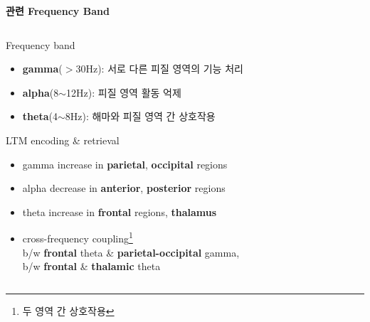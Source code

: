 \documentclass{beamer}
\begin{document}
\begin{frame}{\textbf{관련 Frequency Band}}
  \begin{columns}
    \begin{column}{0.58\textwidth}
      \begin{block}{Frequency band}
        \begin{itemize}
          \item \textbf{gamma}($>$30Hz): 서로 다른 피질 영역의 기능 처리 
          \item \textbf{alpha}(8$\sim$12Hz): 피질 영역 활동 억제
          \item \textbf{theta}(4$\sim$8Hz): 해마와 피질 영역 간 상호작용
        \end{itemize}
      \end{block}
      \begin{block}{LTM encoding \& retrieval}
        \begin{itemize}
          \item gamma increase in \textbf{parietal}, \textbf{occipital} regions
          \item alpha decrease in \textbf{anterior}, \textbf{posterior} regions
          \item theta increase in \textbf{frontal} regions, \textbf{thalamus}
          \item cross-frequency coupling\footnote{두 영역 간 상호작용} \\b/w \textbf{frontal} theta \& \textbf{parietal-occipital} gamma,\\b/w \textbf{frontal} \& \textbf{thalamic} theta
        \end{itemize}
      \end{block}
    \end{column}
    \hfill
    \begin{column}{0.38\textwidth}
      \begin{figure}
        \centering

\end{figure}
\end{column}
\end{columns}
\end{frame}
\end{document}
